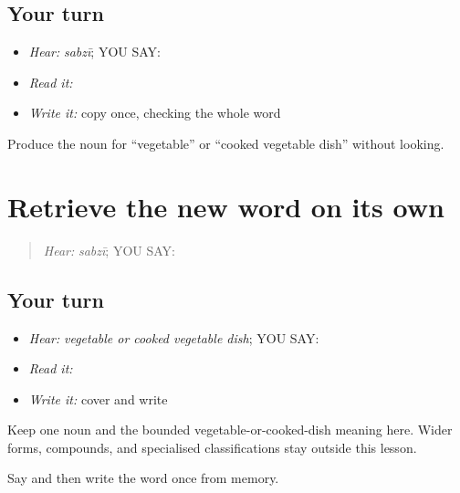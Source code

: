 \subsection*{Your turn}
\begin{itemize}
\raggedright
  \item \emph{Hear:} \emph{sabzī}; YOU SAY: \textbf{}
  \item \emph{Read it:} \textbf{}
  \item \emph{Write it:} copy \textbf{} once, checking the whole word
\end{itemize}

\begin{tcolorbox}[breakable,colback=teal!4,colframe=teal!35!black,title={Before you move on}]
Produce the noun for “vegetable” or “cooked vegetable dish” without looking.
\end{tcolorbox}
\section[\texorpdfstring{\pa{ਸਬਜ਼ੀ} (sabzi)}{ਸਬਜ਼ੀ (sabzi)}]{Retrieve the new word on its own}

\label{lesson:PA-C200-sabzi-review}



\begin{quote}
\emph{Hear:} \emph{sabzī}; YOU SAY: \textbf{}
\end{quote}

\subsection*{Your turn}
\begin{itemize}
\raggedright
  \item \emph{Hear:} \emph{vegetable or cooked vegetable dish}; YOU SAY: \textbf{}
  \item \emph{Read it:} \textbf{}
  \item \emph{Write it:} cover and write \textbf{}
\end{itemize}

\begin{grammarlens}[title={Grammar Lens}]
Keep one noun and the bounded vegetable-or-cooked-dish meaning here. Wider forms, compounds, and specialised classifications stay outside this lesson.
\end{grammarlens}

\begin{tcolorbox}[breakable,colback=teal!4,colframe=teal!35!black,title={Before you move on}]
Say and then write the word once from memory.
\end{tcolorbox}
